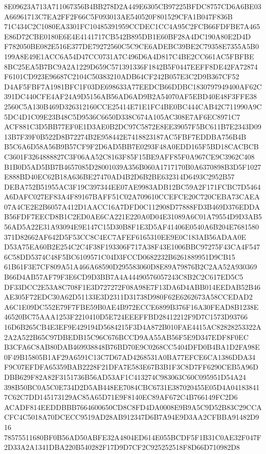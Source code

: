 \documentclass[UTF8,fontset=fandol,zihao=-4,a4paper]{ctexart}
\begin{document}
{{8E09623A713A711067356B4BB278D2A449E6305CB97225BFDC8757CD6A6BE03A66961713C7EA2FF2F66C5F093013AE540520F801529CFA1B047F836B
71C434C2C1080EA3301FC10485391959CCDEC1CC4A95C2FCB66FDFBE7A465E86D72CBE0180E6E4E4141717CB542B895DB1E60BF28A4DC190A80E2D4D
F782050BE082E516E377DE79272560C5C9CE6ADEBC39BE2C79358E7355A5B0199A8E49E1ACC6A54D47CC0731A7C496D6A4D817C4BE2CC661AC5FBFBE
8BC25EA5B7BC9A2A1229D659C571391336F1842B5F0447EEFF8DE42FA72874F6101CD923E96687C2104C50383210ADB64CF242B057E3C2D9B367CF52
D4AF5FBF7A1981BFC1F03DE698633A77EEDCB66DDBC1830797949400AF62C391DC440CFE4AF24A9D5156AB56AD6AD9B2A54070AF5EBD40E48F3FFE38
2560C5A130B469D326312160CCE25414E71E1FC4BE0BC444CAB42C711990A9C5DC4D1C09E23B48C5D9536C6650D338C674A105AC308E7AF6EC8971C7
ACF881C3D5BB77EF0E1D3AE0B2DC97C5872E8EE39057F5BC611B7E2343D0913B7F39F0B522D8B72274B2E958442E7418823187AC5FBF7EDDBA756B4B
B5C6A6D58A56B9B57CF9F2D6AD5BB7E0293F48A0EDD165F5BD18CACBCBC3601F3264888827C3F06AA52C8163F85F15BE9AFF85F0A967CE9C3962C408
B1B0D5AD5BB7B4657085D28001039A356B060A1717170B0A6370898B3D5F1027E888BD40EC62B18A636BE27470AD4B2D6B2BE632314D6493C2952B57
DEBA752B51955AC3F19C397344EE07AE9983ADB12BC59A2F171FCBC7D5464A6DAFC027EF83A4F89167BAFF51C02A709610CCEFCE20C720CEBA73CAEA
07A4CE2E2B6057A412D1AACC16A7DFD0C112908D77888FD3B469D376EDDAB56FDF7EECD8B1C2ED0AE6CA221E220A0D04E31089A6C01A79554D9D3AB5
56AD5A22E31A93094E9E147C15D30B8F1E3D5AF41406E0540A6B204E7681580371D82662AF642D5F53CC8C4EC7AFEF6165310EE9E0C183AB56ADAA0E
D53A75EA60B2E254C2C4F38F193306F717A38F43E1006BBC97275F43CA4F5476C58DD5374C48F5BC6109571C04D3FCCD0682232B6261889951D9CB15
61B61F3E7CF809A51A466A68590D295583060D8E89A79876B2C2AA52A930369B66D4AB57AF79F3E6CD9D3BB7A4A44490576057243C8B2C2C617ED5C5
DF33DCC2E53A8C708F1E3D727272F08A98E7F13DA6D4ABB014EEDAB52B46AE305F72EDC30A62D51133E3D2311D31738D980F62E6262673A58CCEDAD2
A6C1E09DC552E79F7FBE59B0AE4B972ECCE6899B376F16A30FEAD8B1238E46520BC75AAA1253F2210410D5E724EEEFFBD28412212F9D7C1573D93766
16D6B265CB4E3EF9E429194D5684215F3D4A872B010FAE4415AC82828253322A2A2A522B65C97DBEDB15C96C676BCCD9AA55AB56F5E9D347EDF8F0EC
B3CFA6C8AB80DAB469938848B76BD70E9C0268CC5404DFD0B4BA1D2FA98E0F49B15805B1AF29A6591C13C7D67AD4268531A0BA77EFCE6CA1386DDA34
F9C07EFDFA65359BAB2228F21DFA7E583E67B3B1F3C8D7FF6290CEB5A96DDBB629F82A82F3151736B56AD53AF1C413274C983063C60C095951D54A24
398B50BC0A5C0E734D2D5AB448EE7084CBC6731E387020455E05D4A041838417C62C7DD145173129AC85A65D71E9F8140EC89AF672C4B766149FC2D6
ACADF814EEDDBBB7664600650CD8C8FD4DA0008E9B9A5C9D52B83C29CCACFC4C5018A70DCECC9519AD28AB912347D6B7A94E9D3AA2CFBBA91482D916
78575511680BF0B56AD50ABFE32A4804ED614E055BCDF5F1B31C0AE32F047F2D33A2A1341DBA220B540282F17D9D7CF2C925252518F8D66D710982D8
}}
\end{document}
